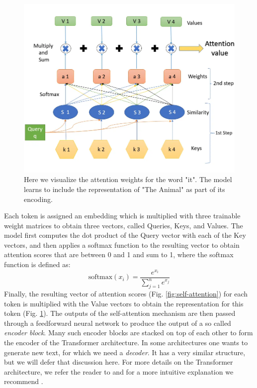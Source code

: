 \begin{figure}[h]
    \includegraphics[width=\linewidth]{chapters/NLP/figures/queries_keys_values.png}
    \caption{Here we visualize the attention weights for the word "it". The model learns to include the representation of "The Animal" as part of its encoding.}
    \label{fig:queries-keys-values}
\end{figure}
Each token is assigned an embedding which is multiplied with three trainable weight matrices to obtain three vectors, called Queries, Keys, and Values.
The model first computes the dot product of the Query vector with each of the Key vectors, and then applies a softmax function to the resulting vector to obtain attention scores that are between 0 and 1 and sum to 1, where the softmax function is defined as:
\begin{equation}
    \text{softmax}(x_i) = \frac{e^{x_i}}{\sum_{j=1}^{n} e^{x_j}}
\end{equation}
Finally, the resulting vector of attention scores (Fig. \ref{fig:self-attention}) for each token is multiplied with the Value vectors to obtain the representation for this token (Fig. \ref{fig:queries-keys-values}).
The outputs of the self-attention mechanism are then passed through a feedforward neural network to produce the output of a so called \textit{encoder block}.
Many such encoder blocks are stacked on top of each other to form the encoder of the Transformer architecture.
In some architectures one wants to generate new text, for which we need a \textit{decoder}.
It has a very similar structure, but we will defer that discussion here.
For more details on the Transformer architecture, we refer the reader to \cite{vaswani2017attention} and for a more intuitive explanation we recommend \cite{illustratedtransformer}.

